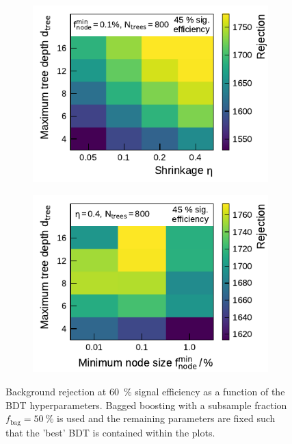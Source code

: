 \begin{figure}[htbp]
\begin{subfigure}[t]{0.48\textwidth}
    \subcaption{}
  \end{subfigure}
  \begin{subfigure}[t]{0.48\textwidth}
    \centering
    \includegraphics{./figures/bdt_perf/gridsearch_3p/scan_Shrinkage_MaxDepth.pdf}
    \subcaption{}
  \end{subfigure}\hfill
  \begin{subfigure}[t]{0.48\textwidth}
    \centering
    \includegraphics{./figures/bdt_perf/gridsearch_3p/scan_MinNodeSize_MaxDepth.pdf}
    \subcaption{}
  \end{subfigure}
  \caption{Background rejection at \SI{60}{\percent} signal efficiency as a
    function of the BDT hyperparameters. Bagged boosting with a subsample
    fraction~$f_\text{bag} = \SI{50}{\percent}$ is used and the remaining
    parameters are fixed such that the 'best' BDT is contained within the
    plots.}
  \label{fig:hyperparameter_scan_3p}
\end{figure}

